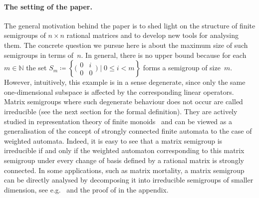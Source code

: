 \documentclass{lmcs}
\theoremstyle{definition}
\newcommand{\N}{\mathbb{N}}
\begin{document}

\paragraph*{The setting of the paper.} The general motivation behind the paper is to shed light on the structure of finite semigroups of $n \times n$ rational matrices and to develop new tools for analysing them. 
The concrete question we pursue here is about the maximum size of such semigroups in terms of~$n$. In general, there is no upper bound because for each $m \in \N$ the set $S_m \coloneqq \left\{ \big(\begin{smallmatrix} 0 & i \\ 0 & 0 \end{smallmatrix}\big) \mid 0 \le i < m \right\}$ forms a semigroup of size~$m$. However, intuitively, this example is in a sense degenerate, since only the same one-dimensional subspace is affected by the corresponding linear operators. Matrix semigroups where such degenerate behaviour does not occur are called irreducible (see the next section for the formal definition). They are actively studied in representation theory of finite monoids~\cite[Chapter 5]{Steinberg2016} and can be viewed as a generalisation of the concept of strongly connected finite automata to the case of weighted automata. Indeed, it is easy to see that a matrix semigroup is irreducible if and only if the weighted automaton corresponding to this matrix semigroup under every change of basis defined by a rational matrix is strongly connected.
In some applications, such as matrix mortality, a matrix semigroup can be directly analysed by decomposing it into irreducible semigroups of smaller dimension, see e.g.~\cite[Section~5]{AlmeidaSteinberg09} and the proof of  in the appendix.
\end{document}
